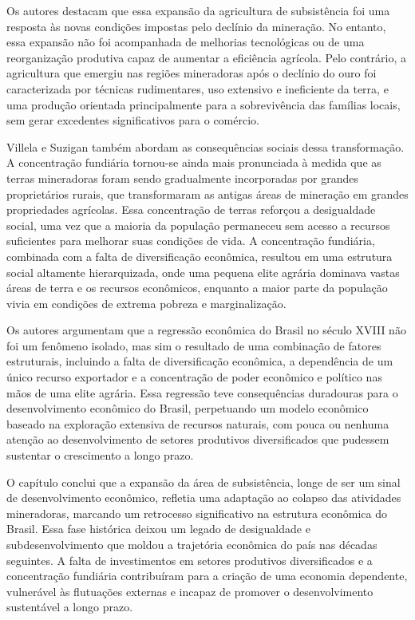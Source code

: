 \documentclass[a4paper,12pt]{article}[abntex2]
\begin{document}
Os autores destacam que essa expansão da agricultura de subsistência foi uma resposta às novas condições impostas pelo declínio da mineração. No entanto, essa expansão não foi acompanhada de melhorias tecnológicas ou de uma reorganização produtiva capaz de aumentar a eficiência agrícola. Pelo contrário, a agricultura que emergiu nas regiões mineradoras após o declínio do ouro foi caracterizada por técnicas rudimentares, uso extensivo e ineficiente da terra, e uma produção orientada principalmente para a sobrevivência das famílias locais, sem gerar excedentes significativos para o comércio.

Villela e Suzigan também abordam as consequências sociais dessa transformação. A concentração fundiária tornou-se ainda mais pronunciada à medida que as terras mineradoras foram sendo gradualmente incorporadas por grandes proprietários rurais, que transformaram as antigas áreas de mineração em grandes propriedades agrícolas. Essa concentração de terras reforçou a desigualdade social, uma vez que a maioria da população permaneceu sem acesso a recursos suficientes para melhorar suas condições de vida. A concentração fundiária, combinada com a falta de diversificação econômica, resultou em uma estrutura social altamente hierarquizada, onde uma pequena elite agrária dominava vastas áreas de terra e os recursos econômicos, enquanto a maior parte da população vivia em condições de extrema pobreza e marginalização.

Os autores argumentam que a regressão econômica do Brasil no século XVIII não foi um fenômeno isolado, mas sim o resultado de uma combinação de fatores estruturais, incluindo a falta de diversificação econômica, a dependência de um único recurso exportador e a concentração de poder econômico e político nas mãos de uma elite agrária. Essa regressão teve consequências duradouras para o desenvolvimento econômico do Brasil, perpetuando um modelo econômico baseado na exploração extensiva de recursos naturais, com pouca ou nenhuma atenção ao desenvolvimento de setores produtivos diversificados que pudessem sustentar o crescimento a longo prazo.

O capítulo conclui que a expansão da área de subsistência, longe de ser um sinal de desenvolvimento econômico, refletia uma adaptação ao colapso das atividades mineradoras, marcando um retrocesso significativo na estrutura econômica do Brasil. Essa fase histórica deixou um legado de desigualdade e subdesenvolvimento que moldou a trajetória econômica do país nas décadas seguintes. A falta de investimentos em setores produtivos diversificados e a concentração fundiária contribuíram para a criação de uma economia dependente, vulnerável às flutuações externas e incapaz de promover o desenvolvimento sustentável a longo prazo.
\end{document}

